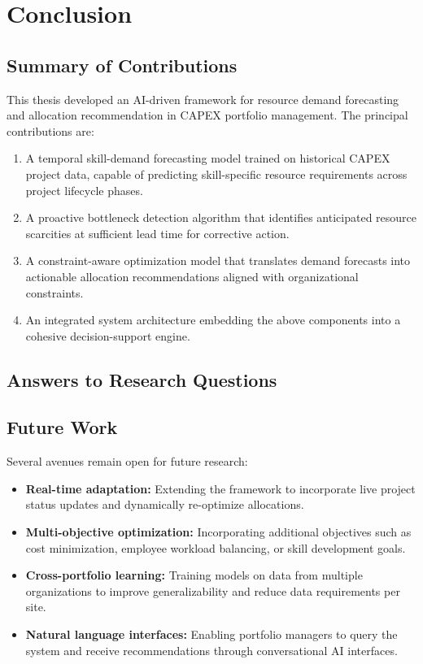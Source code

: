 \chapter{Conclusion}
\label{chap:conclusion}

\section{Summary of Contributions}
\label{sec:contributions}

This thesis developed an AI-driven framework for resource demand forecasting and allocation recommendation in CAPEX portfolio management. The principal contributions are:

\begin{enumerate}
  \item A temporal skill-demand forecasting model trained on historical CAPEX project data, capable of predicting skill-specific resource requirements across project lifecycle phases.
  \item A proactive bottleneck detection algorithm that identifies anticipated resource scarcities at sufficient lead time for corrective action.
  \item A constraint-aware optimization model that translates demand forecasts into actionable allocation recommendations aligned with organizational constraints.
  \item An integrated system architecture embedding the above components into a cohesive decision-support engine.
\end{enumerate}


\section{Answers to Research Questions}
\label{sec:rq_answers}


\section{Future Work}
\label{sec:future_work}

Several avenues remain open for future research:

\begin{itemize}
  \item \textbf{Real-time adaptation:} Extending the framework to incorporate live project status updates and dynamically re-optimize allocations.
  \item \textbf{Multi-objective optimization:} Incorporating additional objectives such as cost minimization, employee workload balancing, or skill development goals.
  \item \textbf{Cross-portfolio learning:} Training models on data from multiple organizations to improve generalizability and reduce data requirements per site.
  \item \textbf{Natural language interfaces:} Enabling portfolio managers to query the system and receive recommendations through conversational AI interfaces.
\end{itemize}
